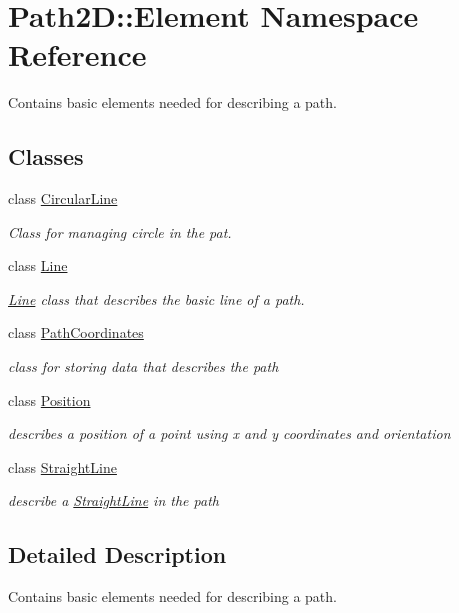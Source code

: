 \hypertarget{namespace_path2_d_1_1_element}{}\section{Path2D\+:\+:Element Namespace Reference}
\label{namespace_path2_d_1_1_element}


Contains basic elements needed for describing a path.  


\subsection*{Classes}
\begin{DoxyCompactItemize}
\item 
class \mbox{\hyperlink{class_path2_d_1_1_element_1_1_circular_line}{Circular\+Line}}
\begin{DoxyCompactList}\small\item\em Class for managing circle in the pat. \end{DoxyCompactList}\item 
class \mbox{\hyperlink{class_path2_d_1_1_element_1_1_line}{Line}}
\begin{DoxyCompactList}\small\item\em \mbox{\hyperlink{class_path2_d_1_1_element_1_1_line}{Line}} class that describes the basic line of a path. \end{DoxyCompactList}\item 
class \mbox{\hyperlink{class_path2_d_1_1_element_1_1_path_coordinates}{Path\+Coordinates}}
\begin{DoxyCompactList}\small\item\em class for storing data that describes the path \end{DoxyCompactList}\item 
class \mbox{\hyperlink{class_path2_d_1_1_element_1_1_position}{Position}}
\begin{DoxyCompactList}\small\item\em describes a position of a point using x and y coordinates and orientation \end{DoxyCompactList}\item 
class \mbox{\hyperlink{class_path2_d_1_1_element_1_1_straight_line}{Straight\+Line}}
\begin{DoxyCompactList}\small\item\em describe a \mbox{\hyperlink{class_path2_d_1_1_element_1_1_straight_line}{Straight\+Line}} in the path \end{DoxyCompactList}\end{DoxyCompactItemize}


\subsection{Detailed Description}
Contains basic elements needed for describing a path. 